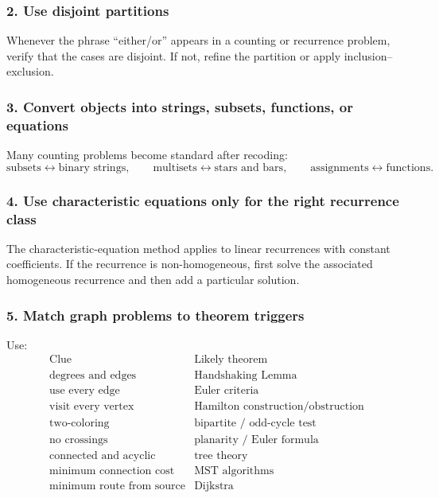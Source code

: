 \subsubsection*{2. Use disjoint partitions}
Whenever the phrase ``either/or'' appears in a counting or recurrence problem, verify that the cases are disjoint. If not, refine the partition or apply inclusion--exclusion.

\subsubsection*{3. Convert objects into strings, subsets, functions, or equations}
Many counting problems become standard after recoding:
\[
\text{subsets}\leftrightarrow\text{binary strings},
\qquad
\text{multisets}\leftrightarrow\text{stars and bars},
\qquad
\text{assignments}\leftrightarrow\text{functions}.
\]

\subsubsection*{4. Use characteristic equations only for the right recurrence class}
The characteristic-equation method applies to linear recurrences with constant coefficients. If the recurrence is non-homogeneous, first solve the associated homogeneous recurrence and then add a particular solution.

\subsubsection*{5. Match graph problems to theorem triggers}
Use:
\[
\begin{array}{c|c}
\text{Clue} & \text{Likely theorem} \\ \hline
\text{degrees and edges} & \text{Handshaking Lemma} \\
\text{use every edge} & \text{Euler criteria} \\
\text{visit every vertex} & \text{Hamilton construction/obstruction} \\
\text{two-coloring} & \text{bipartite / odd-cycle test} \\
\text{no crossings} & \text{planarity / Euler formula} \\
\text{connected and acyclic} & \text{tree theory} \\
\text{minimum connection cost} & \text{MST algorithms} \\
\text{minimum route from source} & \text{Dijkstra}
\end{array}
\]

